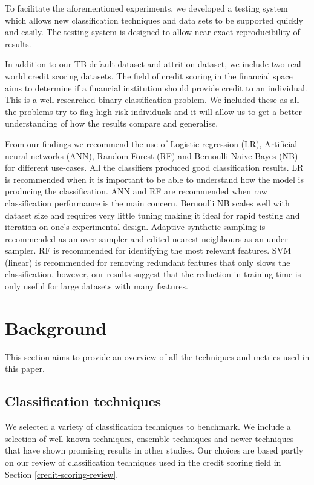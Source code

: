 \documentclass{sig-alternate-05-2015}
\begin{document}
	To facilitate the aforementioned experiments, we developed a testing system which allows new classification techniques and data sets to be supported quickly and easily. The testing system is designed to allow near-exact reproducibility of results.
	
	In addition to our TB default dataset and attrition dataset, we include two real-world credit scoring datasets. The field of credit scoring in the financial space aims to determine if a financial institution should provide credit to an individual. This is a well researched binary classification problem. We included these as all the problems try to flag high-risk individuals and it will allow us to get a better understanding of how the results compare and generalise.
	
	From our findings we recommend the use of Logistic regression (LR), Artificial neural networks (ANN), Random Forest (RF) and Bernoulli Naive Bayes (NB) for different use-cases. All the classifiers produced good classification results. LR is recommended when it is important to be able to understand how the model is producing the classification. ANN and RF are recommended when raw classification performance is the main concern. Bernoulli NB scales well with dataset size and requires very little tuning making it ideal for rapid testing and iteration on one's experimental design. Adaptive synthetic sampling is recommended as an over-sampler and edited nearest neighbours as an under-sampler. RF is recommended for identifying the most relevant features. SVM (linear) is recommended for removing redundant features that only slows the classification, however, our results suggest that the reduction in training time is only useful for large datasets with many features.
	
	\section{Background}
	This section aims to provide an overview of all the techniques and metrics used in this paper.
	
	\subsection{Classification techniques}
	We selected a variety of classification techniques to benchmark. We include a selection of well known techniques, ensemble techniques and newer techniques that have shown promising results in other studies. Our choices are based partly on our review of classification techniques used in the credit scoring field in Section \ref{credit-scoring-review}.
\end{document}
